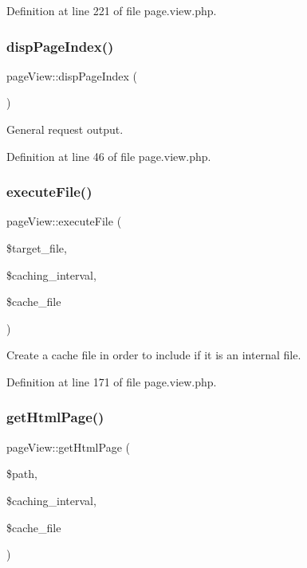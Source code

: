 Definition at line 221 of file page.\+view.\+php.

\mbox{\label{classpageView_a9e3cf0b29ff11a4bbb1ec1ccfacd4236}} 
\subsubsection{\texorpdfstring{disp\+Page\+Index()}{dispPageIndex()}}
{\footnotesize\ttfamily page\+View\+::disp\+Page\+Index (\begin{DoxyParamCaption}{ }\end{DoxyParamCaption})}



General request output. 



Definition at line 46 of file page.\+view.\+php.

\mbox{\label{classpageView_a198777f4c0155f8ad2a0c2826221395e}} 
\subsubsection{\texorpdfstring{execute\+File()}{executeFile()}}
{\footnotesize\ttfamily page\+View\+::execute\+File (\begin{DoxyParamCaption}\item[{}]{\$target\+\_\+file,  }\item[{}]{\$caching\+\_\+interval,  }\item[{}]{\$cache\+\_\+file }\end{DoxyParamCaption})}



Create a cache file in order to include if it is an internal file. 



Definition at line 171 of file page.\+view.\+php.

\mbox{\label{classpageView_af3d32b790b5703c5eb384060b24d619e}} 
\subsubsection{\texorpdfstring{get\+Html\+Page()}{getHtmlPage()}}
{\footnotesize\ttfamily page\+View\+::get\+Html\+Page (\begin{DoxyParamCaption}\item[{}]{\$path,  }\item[{}]{\$caching\+\_\+interval,  }\item[{}]{\$cache\+\_\+file }\end{DoxyParamCaption})}



